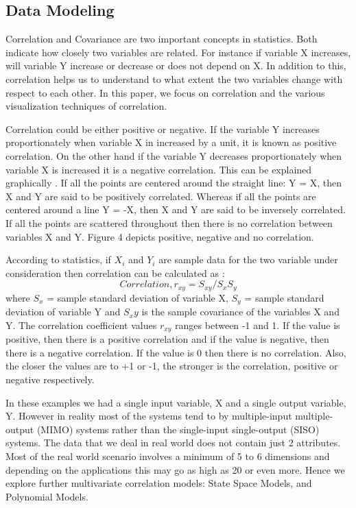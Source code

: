 \documentclass[article,type=msc,colorback,12pt,accentcolor=tud7b]{tudthesis}
\begin{document}
	\subsection{Data Modeling}
	
	Correlation and Covariance are two important concepts in statistics. Both indicate how closely two variables are related. For instance if variable X increases, will variable Y increase or decrease or does not depend on X. In addition to this, correlation helps us to understand to what extent the two variables change with respect to each other. In this paper, we focus on correlation and the various visualization techniques of correlation. 

\par
Correlation could be either positive or negative. If the variable Y increases proportionately when variable X in increased by a unit, it is known as positive correlation. On the other hand if the variable Y decreases proportionately when variable X is increased it is a negative correlation. This can be explained graphically \cite{correlation}. If all the points are centered around the straight line: Y = X, then X and Y are said to be positively correlated. Whereas if all the points are centered around a line Y = -X, then X and Y are said to be inversely correlated. If all the points are scattered throughout then there is no correlation between variables X and Y. Figure 4 depicts positive, negative and no correlation.

\par
According to statistics, if $X_i$ and $Y_i$ are sample data for the two variable under consideration then correlation can be calculated as \cite{correlation}: $$ Correlation, r_{xy} = S_{xy} / S_x S_y $$ where $S_x$ = sample standard deviation of variable X,
$S_y$ = sample standard deviation of variable Y and
$S_xy$ is the sample covariance of the variables X and Y.
The correlation coefficient values $r_{xy}$ ranges between -1 and 1. If the value is positive, then there is a positive correlation and if the value is negative, then there is a negative correlation. If the value is 0 then there is no correlation. Also, the closer the values are to +1 or -1, the stronger is the correlation, positive or negative respectively.
\par
In these examples we had a single input variable, X and a single output variable, Y. However in reality most of the systems tend to by multiple-input multiple-output (MIMO) systems rather than the single-input single-output (SISO) systems. The data that we deal in real world does not contain just 2 attributes. Most of the real world scenario involves a minimum of 5 to 6 dimensions and depending on the applications this may go as high as 20 or even more. Hence we explore further multivariate correlation models: State Space Models, and Polynomial Models.
\end{document}
